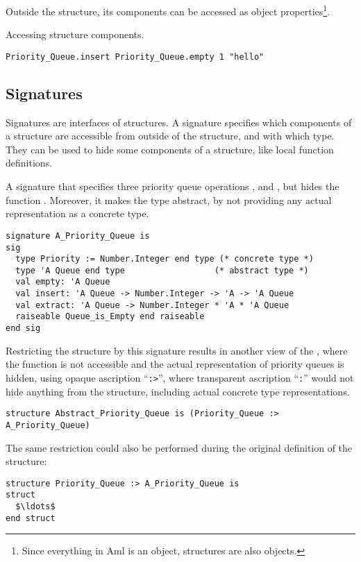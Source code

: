 Outside the structure, its components can be accessed as object properties\footnote{Since everything in Aml is an object, structures are also objects.}. 

\example Accessing structure components.
\begin{lstlisting}
Priority_Queue.insert Priority_Queue.empty 1 "hello"
\end{lstlisting}






\subsection{Signatures}

Signatures are interfaces of structures. A signature specifies which components of a structure are accessible from outside of the structure, and with which type. They can be used to hide some components of a structure, like local function definitions. 

\example A signature that specifies three priority queue operations ,  and , but hides the function . Moreover, it makes the  type abstract, by not providing any actual representation as a concrete type. 
\begin{lstlisting}
signature A_Priority_Queue is
sig
  type Priority := Number.Integer end type (* concrete type *)
  type 'A Queue end type                  (* abstract type *)
  val empty: 'A Queue
  val insert: 'A Queue -> Number.Integer -> 'A -> 'A Queue
  val extract: 'A Queue -> Number.Integer * 'A * 'A Queue
  raiseable Queue_is_Empty end raiseable
end sig
\end{lstlisting}
Restricting the  structure by this signature results in another view of the , where the  function is not accessible and the actual representation of priority queues is hidden, using opaque ascription ``\lstinline!:>!'', where transparent ascription ``\lstinline!:!'' would not hide anything from the structure, including actual concrete type representations. 
\begin{lstlisting}
structure Abstract_Priority_Queue is (Priority_Queue :> A_Priority_Queue)
\end{lstlisting}
The same restriction could also be performed during the original definition of the structure:
\begin{lstlisting}
structure Priority_Queue :> A_Priority_Queue is
struct 
  $\ldots$
end struct
\end{lstlisting}





